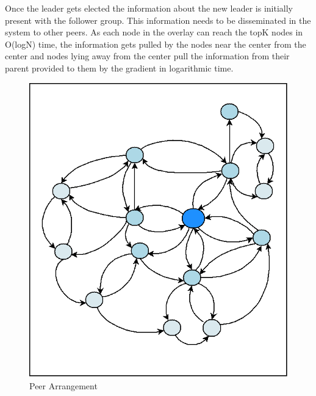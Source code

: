 \documentclass[a4paper,11pt]{kth-mag}
\begin{document}
Once the leader gets elected the information about the new leader is initially present with the follower group. This information needs to be disseminated in the system to other peers. As each node in the overlay can reach the topK nodes in O(logN) time, the information gets pulled by the nodes near the center from the center and nodes lying away from the center pull the information from their parent provided to them by the gradient in logarithmic time.

\begin{figure}[h]
	\includegraphics[scale=0.5]{p2p}
	\centering
	\caption{Peer Arrangement}
	\label{fig:p-arrange}
\end{figure}
\end{document}
